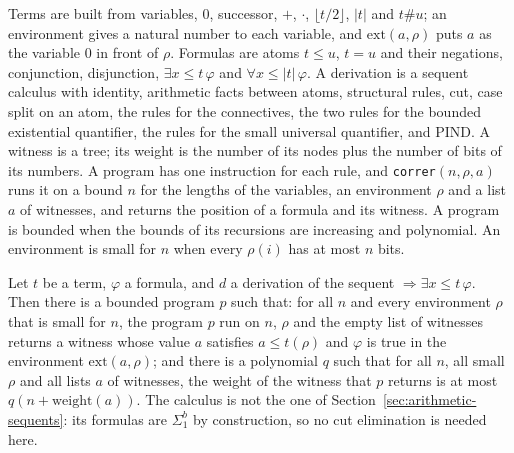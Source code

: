 \begin{definition}
  \label{def:arithmetic-witness-calculus}
  \leanok
  \own{}
  \infrastructure{}
  Terms are built from variables, $0$, successor, $+$, $\cdot$, $\lfloor t/2 \rfloor$, $|t|$ and
  $t \# u$; an environment gives a natural number to each variable, and $\mathrm{ext}(a, \rho)$ puts
  $a$ as the variable $0$ in front of $\rho$. Formulas are atoms $t \le u$, $t = u$ and their
  negations, conjunction, disjunction, $\exists x \le t\, \varphi$ and $\forall x \le |t|\,
  \varphi$. A derivation is a sequent calculus with identity, arithmetic facts between atoms,
  structural rules, cut, case split on an atom, the rules for the connectives, the two rules for the
  bounded existential quantifier, the rules for the small universal quantifier, and PIND. A witness
  is a tree; its weight is the number of its nodes plus the number of bits of its numbers. A
  program has one instruction for each rule, and \texttt{correr}$(n, \rho, a)$ runs it on a bound
  $n$ for the lengths of the variables, an environment $\rho$ and a list $a$ of witnesses, and
  returns the position of a formula and its witness. A program is bounded when the bounds of its
  recursions are increasing and polynomial. An environment is small for $n$ when every $\rho(i)$
  has at most $n$ bits.
\end{definition}

\begin{theorem}
  \label{thm:arithmetic-witness-lemma}
  \leanok
  Let $t$ be a term, $\varphi$ a formula, and $d$ a derivation of the sequent $\Rightarrow \exists x
  \le t\, \varphi$. Then there is a bounded program $p$ such that: for all $n$ and every environment
  $\rho$ that is small for $n$, the program $p$ run on $n$, $\rho$ and the empty list of witnesses
  returns a witness whose value $a$ satisfies $a \le t(\rho)$ and $\varphi$ is true in the
  environment $\mathrm{ext}(a, \rho)$; and there is a polynomial $q$ such that for all $n$, all
  small $\rho$ and all lists $a$ of witnesses, the weight of the witness that $p$ returns is at most
  $q(n + \text{weight}(a))$.
  The calculus is not the one of Section~\ref{sec:arithmetic-sequents}: its formulas are $\Sigma^b_1$
  by construction, so no cut elimination is needed here.
\end{theorem}

